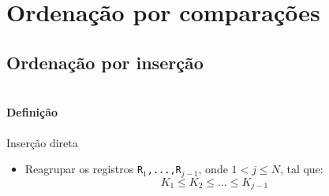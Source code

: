 \section{Ordenação por comparações}

\subsection{Ordenação por inserção}

\fi





\lecpreamble
\sortlstset



\section{\insertlecture}

\frame{\title{\insertlecture}\author{\thisauthor}\maketitle}

\begin{frame}{\insertlecture}
\framesubtitle{Definição}

\begin{block}{Inserção direta}

  \begin{itemize}
  \item Reagrupar os registros {\tt R$_1$,...,R$_{j-1}$}, onde $1 < j \leq N$, tal que:
    \[K_1 \leq K_2 \leq \hdots \leq K_{j-1} \]
  \end{itemize}
\end{block}
\end{frame}

